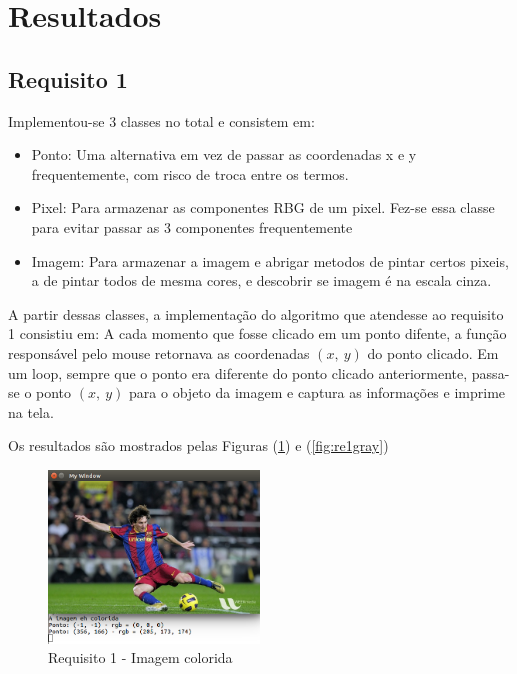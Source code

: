 \section{Resultados}

\subsection{Requisito 1}

Implementou-se 3 classes no total e consistem em:


\begin{itemize}
\item Ponto: Uma alternativa em vez de passar as coordenadas x e y frequentemente, com risco de troca entre os termos.
\item Pixel: Para armazenar as componentes RBG de um pixel. Fez-se essa classe para evitar passar as 3 componentes frequentemente
\item Imagem: Para armazenar a imagem e abrigar metodos de pintar certos pixeis, a de pintar todos de mesma cores, e descobrir se imagem é na escala cinza.
\end{itemize}

 A partir dessas classes, a implementação do algoritmo que atendesse ao requisito 1 consistiu em: A cada momento que fosse clicado em um ponto difente, a função responsável pelo mouse retornava as coordenadas $(x, \ y)$ do ponto clicado. Em um loop, sempre que o ponto era diferente do ponto clicado anteriormente, passa-se o ponto $(x, \ y)$ para o objeto da imagem e captura as informações e imprime na tela.

Os resultados são mostrados pelas Figuras (\ref{fig:re1color}) e (\ref{fig:re1gray})

\begin{figure}[!ht]
\centering
\label{fig:re1color}
\caption{Requisito 1 - Imagem colorida}
\includegraphics[width=0.5\textwidth]{img/T1_colored.png}
\end{figure}

